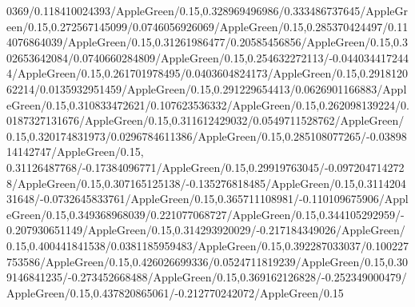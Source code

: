 {\begin{tikzternal}
{0369/0.118410024393/AppleGreen/0.15,0.328969496986/0.333486737645/AppleGreen/0.15,0.272567145099/0.0746056926069/AppleGreen/0.15,0.285370424497/0.114076864039/AppleGreen/0.15,0.31261986477/0.20585456856/AppleGreen/0.15,0.302653642084/0.0740660284809/AppleGreen/0.15,0.254632272113/-0.0440344172444/AppleGreen/0.15,0.261701978495/0.0403604824173/AppleGreen/0.15,0.291812062214/0.0135932951459/AppleGreen/0.15,0.291229654413/0.0626901166883/AppleGreen/0.15,0.310833472621/0.107623536332/AppleGreen/0.15,0.262098139224/0.0187327131676/AppleGreen/0.15,0.311612429032/0.0549711528762/AppleGreen/0.15,0.320174831973/0.0296784611386/AppleGreen/0.15,0.285108077265/-0.0389814142747/AppleGreen/0.15,
0.31126487768/-0.17384096771/AppleGreen/0.15,0.29919763045/-0.0972047142728/AppleGreen/0.15,0.307165125138/-0.135276818485/AppleGreen/0.15,0.311420431648/-0.0732645833761/AppleGreen/0.15,0.365711108981/-0.110109675906/AppleGreen/0.15,0.349368968039/0.221077068727/AppleGreen/0.15,0.344105292959/-0.207930651149/AppleGreen/0.15,0.314293920029/-0.217184349026/AppleGreen/0.15,0.400441841538/0.0381185959483/AppleGreen/0.15,0.392287033037/0.100227753586/AppleGreen/0.15,0.426026699336/0.0524711819239/AppleGreen/0.15,0.309146841235/-0.273452668488/AppleGreen/0.15,0.369162126828/-0.252349000479/AppleGreen/0.15,0.437820865061/-0.212770242072/AppleGreen/0.15} {
 \CLUSTERCIRCLE[\c]{(\x,\y)}{\r}
}

\end{tikzternal}}
